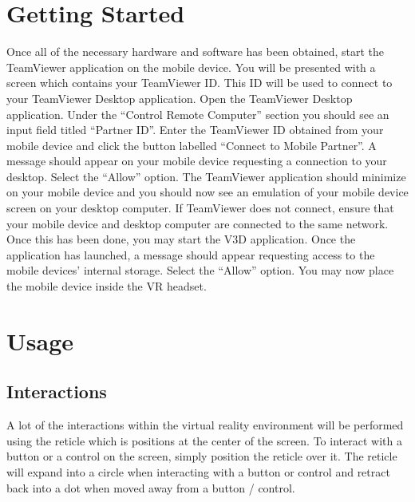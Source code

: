 \documentclass[english]{article}
\begin{document}
\section{Getting Started}
Once all of the necessary hardware and software has been obtained, start the TeamViewer application on the mobile device. You will be presented with a screen which contains your TeamViewer ID. This ID will be used to connect to your TeamViewer Desktop application. Open the TeamViewer Desktop application. Under the “Control Remote Computer” section you should see an input field titled “Partner ID”. Enter the TeamViewer ID obtained from your mobile device and click the button labelled “Connect to Mobile Partner”. A message should appear on your mobile device requesting a connection to your desktop. Select the “Allow” option. The TeamViewer application should minimize on your mobile device and you should now see an emulation of your mobile device screen on your desktop computer. If TeamViewer does not connect, ensure that your mobile device and desktop computer are connected to the same network. Once this has been done, you may start the V3D application. Once the application has launched, a message should appear requesting access to the mobile devices’ internal storage. Select the “Allow” option. You may now place the mobile device inside the VR headset.

\section{Usage} 
\subsection{Interactions}
A lot of the interactions within the virtual reality environment will be performed using the reticle which is positions at the center of the screen. To interact with a button or a control on the screen, simply position the reticle over it. The reticle will expand into a circle when interacting with a button or control and retract back into a dot when moved away from a button / control.
\end{document}
